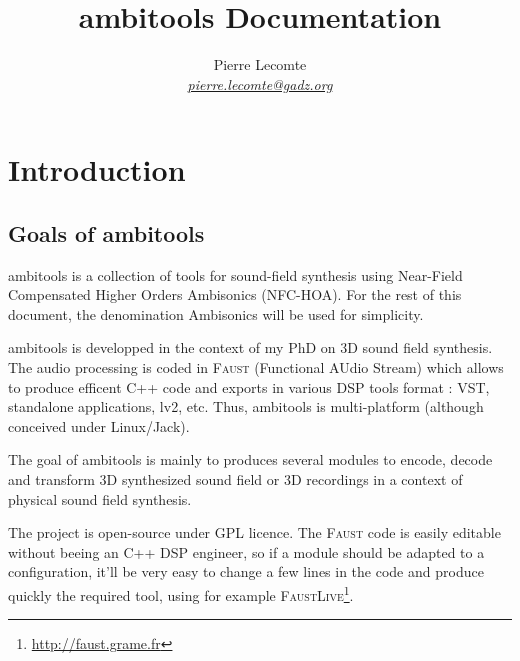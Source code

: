 \documentclass[10pt,a4paper]{article}
\author{Pierre Lecomte \\ \textit{ \href{mailto:pierre.lecomte@gadz.org}{pierre.lecomte@gadz.org}}}
\title{ambitools Documentation}
\begin{document}

\makeatletter
\newcommand\footnoteref[1]{\protected@xdef\@thefnmark{\ref{#1}}\@footnotemark}
\makeatother

\maketitle
\tableofcontents
\section{Introduction}

\subsection{Goals of ambitools}
ambitools is a collection of tools for sound-field synthesis using Near-Field Compensated Higher Orders Ambisonics (NFC-HOA). For the rest of this document, the denomination Ambisonics will be used for simplicity.

ambitools is developped in the context of my PhD on 3D sound field synthesis. The audio processing is coded in \textsc{Faust}\footnoteref{faustlive} (Functional AUdio Stream) which allows to produce efficent C++ code and exports in various DSP tools format : VST, standalone applications, lv2, etc. Thus, ambitools is multi-platform (although conceived under Linux/Jack).

The goal of ambitools is mainly to produces several modules to encode, decode and transform 3D synthesized sound field or 3D recordings in a context of physical sound field synthesis. 

The project is open-source under GPL licence. The \textsc{Faust} code is easily editable without beeing an C++ DSP engineer, so if a module should be adapted to a configuration, it'll be very easy to change a few lines in the code and produce quickly the required tool, using for example \textsc{FaustLive}\footnote{\label{faustlive}\url{http://faust.grame.fr}}.
\end{document}
